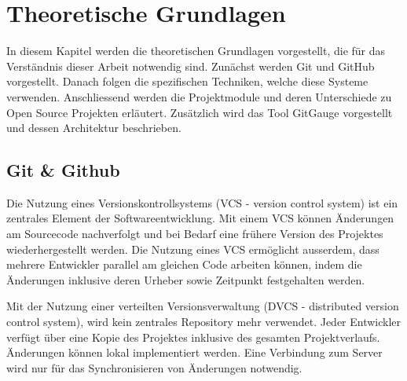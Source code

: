 

\label{Chapter3} %


\chapter{Theoretische Grundlagen} %

In diesem Kapitel werden die theoretischen Grundlagen vorgestellt, die für das Verständnis dieser Arbeit notwendig sind. Zunächst werden Git und GitHub vorgestellt. Danach folgen die spezifischen Techniken, welche diese Systeme verwenden. Anschliessend werden die Projektmodule und deren Unterschiede zu Open Source Projekten erläutert. Zusätzlich wird das Tool GitGauge vorgestellt und dessen Architektur beschrieben.

\label{Chapter2} %


\section{Git \& Github}
Die Nutzung eines Versionskontrollsystems (VCS - version control system) ist ein zentrales Element der Softwareentwicklung. Mit einem VCS können Änderungen am Sourcecode nachverfolgt und bei Bedarf eine frühere Version des Projektes wiederhergestellt werden. Die Nutzung eines VCS ermöglicht ausserdem, dass mehrere Entwickler parallel am gleichen Code arbeiten können, indem die Änderungen inklusive deren Urheber sowie Zeitpunkt festgehalten werden. 

Mit der Nutzung einer verteilten Versionsverwaltung (DVCS - distributed version control system), wird kein zentrales Repository mehr verwendet. Jeder Entwickler verfügt über eine Kopie des Projektes inklusive des gesamten Projektverlaufs. Änderungen können lokal implementiert werden. Eine Verbindung zum Server wird nur für das Synchronisieren von Änderungen notwendig. \parencite{noauthor_informationen_2025} 

